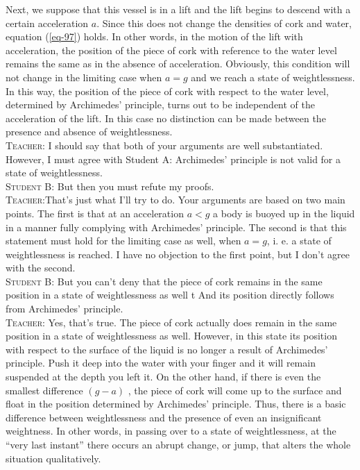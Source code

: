 \documentclass[a4paper,sfsidenotes]{tufte-book}
\begin{document}
Next, we suppose that this vessel is in a lift and the lift begins to descend with a certain acceleration $a$. Since this does not change the densities of cork and water, equation (\ref{eq-97}) holds. In other words, in the motion of the lift with acceleration, the position of the piece of cork with reference to the water level remains the same as in the absence of acceleration. Obviously, this condition will not change in the limiting case when $a=g$ and we reach a state of weightlessness. In this way, the position of the piece of cork with respect to the water level, determined by Archimedes' principle, turns out to be independent of the acceleration of the lift. In this case no distinction can be made between the presence and absence of weightlessness.
\\
\textsc{Teacher:} I should say that both of your arguments are well substantiated. However, I must agree with Student A: Archimedes' principle is not valid for a state of weightlessness.
\\
\textsc{Student B:} But then you must refute my proofs. 
\\
\textsc{Teacher:}That's just what I'll try to do. Your arguments are based on two main points. The first is that at an acceleration $a<g$ a body is buoyed up in the liquid in a manner fully complying with Archimedes' principle. The second is that this statement must hold for the limiting case as well, when $a=g$, i. e. a state of weightlessness is reached. I have no objection to the first point, but I don't agree with the second.
\\
\textsc{Student B:} But you can't deny that the piece of cork remains in the same position in a state of weightlessness as well t And its position directly follows from Archimedes' principle.
\\
\textsc{Teacher:} Yes, that's true. The piece of cork actually does remain in the same position in a state of weightlessness as well. However, in this state its position with respect to the surface of the liquid is no longer a result of Archimedes' principle. Push it deep into the water with your finger and it will remain suspended at the depth you left it. On the other hand, if there is even the smallest difference $(g-a)$ ,
the piece of cork will come up to the surface and float in the position determined by Archimedes' principle. Thus, there is a basic difference between weightlessness and the presence of even an insignificant weightness. In other words, in passing over to a state of weightlessness, at the ``very last instant'' there occurs an abrupt change, or jump, that alters the whole situation qualitatively.
\end{document}
